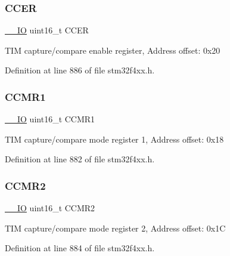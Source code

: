 \subsubsection{\texorpdfstring{C\+C\+ER}{CCER}}
{\footnotesize\ttfamily \hyperlink{group___c_m_s_i_s__core__definitions_gaec43007d9998a0a0e01faede4133d6be}{\+\_\+\+\_\+\+IO} uint16\+\_\+t C\+C\+ER}

T\+IM capture/compare enable register, Address offset\+: 0x20 

Definition at line 886 of file stm32f4xx.\+h.

\mbox{\label{struct_t_i_m___type_def_a90d89aec51d8012b8a565ef48333b24b}} 
\subsubsection{\texorpdfstring{C\+C\+M\+R1}{CCMR1}}
{\footnotesize\ttfamily \hyperlink{group___c_m_s_i_s__core__definitions_gaec43007d9998a0a0e01faede4133d6be}{\+\_\+\+\_\+\+IO} uint16\+\_\+t C\+C\+M\+R1}

T\+IM capture/compare mode register 1, Address offset\+: 0x18 

Definition at line 882 of file stm32f4xx.\+h.

\mbox{\label{struct_t_i_m___type_def_a977b3cf310388b5ad02440d64d03810a}} 
\subsubsection{\texorpdfstring{C\+C\+M\+R2}{CCMR2}}
{\footnotesize\ttfamily \hyperlink{group___c_m_s_i_s__core__definitions_gaec43007d9998a0a0e01faede4133d6be}{\+\_\+\+\_\+\+IO} uint16\+\_\+t C\+C\+M\+R2}

T\+IM capture/compare mode register 2, Address offset\+: 0x1C 

Definition at line 884 of file stm32f4xx.\+h.

\mbox{\label{struct_t_i_m___type_def_adab1e24ef769bbcb3e3769feae192ffb}} 
